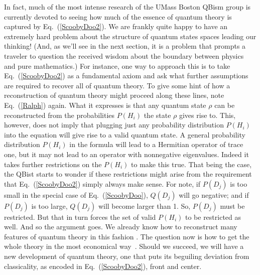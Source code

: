 \documentclass[aps,pra,superscriptaddress,12pt,tightenlines,nofootinbib]{revtex4-2}
\begin{document}
In fact, much of the most intense research of the UMass Boston QBism group is currently devoted to seeing how much of the essence of quantum theory is captured by Eq.~(\ref{ScoobyDoo2}).  We are frankly quite happy to have an extremely hard problem about the structure of quantum states spaces leading our thinking!  (And, as we'll see in the next section, it is a problem that prompts a traveler to question the received wisdom about the boundary between physics and pure mathematics.)  For instance, one way to approach this is to take Eq.~(\ref{ScoobyDoo2}) as a fundamental axiom and ask what further assumptions are required to recover all of quantum theory.  To give some hint of how a reconstruction of quantum theory might proceed along these lines, note Eq.~(\ref{Ralph}) again.  What it expresses is that any quantum state $\rho$ can be reconstructed from the probabilities $P(H_i)$ the state $\rho$ gives rise to.  This, however, does not imply that plugging just any probability distribution $P(H_i)$ into the equation will give rise to a valid quantum state.  A general probability distribution $P(H_i)$ in the formula will lead to a Hermitian operator of trace one, but it may not lead to an operator with nonnegative eigenvalues.  Indeed it takes further restrictions on the $P(H_i)$ to make this true.  That being the case, the QBist starts to wonder if these restrictions might arise from the requirement that Eq.~(\ref{ScoobyDoo2}) simply always make sense.  For note, if $P(D_j)$ is too small in the special case of Eq.~(\ref{ScoobyDoo}), $Q(D_j)$ will go negative; and if $P(D_j)$ is too large, $Q(D_j)$ will become larger than 1.  So, $P(D_j)$ must be restricted.  But that in turn forces the set of valid $P(H_i)$ to be restricted as well.  And so the argument goes.  We already know how to reconstruct many features of quantum theory in this fashion \cite{RMP,Appleby09a,Fuchs09b,Appleby09b}.  The question now is how to get the whole theory in the most economical way~\cite{qplex}.  Should we succeed, we will have a new development of quantum theory, one that puts its beguiling deviation from classicality, as encoded in Eq.~(\ref{ScoobyDoo2}), front and center.
\end{document}

